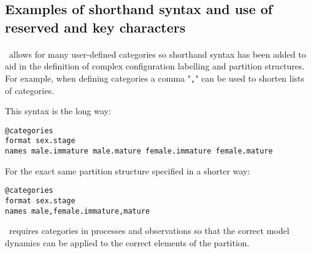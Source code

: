 %
%
%

\subsection{Examples of shorthand syntax and use of reserved and key characters}\label{sec:ShorthandSyntax-section}

\paragraph*{\label{sub:categories}}

\CNAME\ allows for many user-defined categories so shorthand syntax has been added to aid in the definition of complex configuration labelling and partition structures. For example, when defining categories a comma "\texttt{,}" can be used to shorten lists of categories.

This syntax is the long way:

{\small{\begin{verbatim}
@categories
format sex.stage
names male.immature male.mature female.immature female.mature
\end{verbatim}}}

For the exact same partition structure specified in a shorter way:

{\small{\begin{verbatim}
@categories
format sex.stage
names male,female.immature,mature
\end{verbatim}}}

\CNAME\ requires categories in processes and observations so that the correct model dynamics can be applied to the correct elements of the partition.

